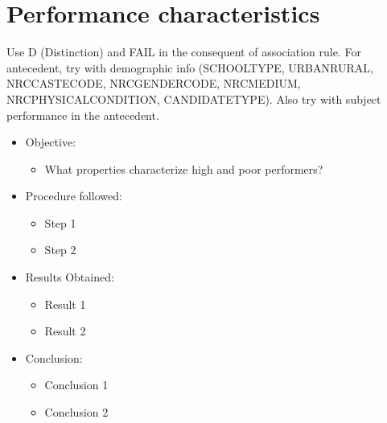 \chapter{Performance characteristics}
Use D (Distinction) and FAIL in the consequent of association rule. For antecedent, try with demographic info (SCHOOL\textunderscore TYPE, URBAN\textunderscore RURAL, NRC\textunderscore CASTE\textunderscore CODE, NRC\textunderscore GENDER\textunderscore CODE, NRC\textunderscore MEDIUM, NRC\textunderscore PHYSICAL\textunderscore CONDITION, CANDIDATE\textunderscore TYPE). Also try with subject performance in the antecedent.

\begin{itemize}
	\item
	Objective:
	\begin{itemize}
		\item
		What properties characterize high and poor performers?		
	\end{itemize}
	
	\item
	Procedure followed: 
	\begin{itemize}
		\item
		Step 1
		\item
		Step 2
	\end{itemize}
	
	\item
	Results Obtained:
	\begin{itemize}
		\item
		Result 1
		\item
		Result 2
	\end{itemize}
	
	\item
	Conclusion:
	\begin{itemize}
		\item
		Conclusion 1
		\item
		Conclusion 2
	\end{itemize}
\end{itemize}